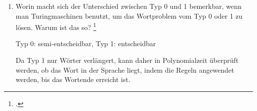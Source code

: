 \documentclass{lehramt-informatik-aufgabe}
\begin{document}
\begin{enumerate}

\item Worin macht sich der Unterschied zwischen Typ 0 und 1 bemerkbar,
wenn man Turingmaschinen benutzt, um das Wortproblem vom Typ 0 oder 1 zu
lösen. Warum ist das so?
\footcite[Aufgabe 5b)]{theo:ab:5}

\begin{liAntwort}
Typ 0: semi-entscheidbar, Typ 1: entscheidbar

Da Typ 1 nur Wörter verlängert, kann daher in Polynomialzeit überprüft
werden, ob das Wort in der Sprache liegt, indem die Regeln angewendet
werden, bis das Wortende erreicht ist.
\end{liAntwort}

\end{enumerate}
\end{document}
